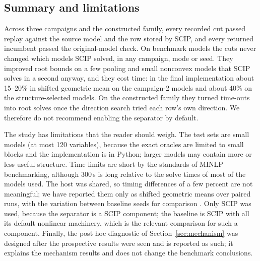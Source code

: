 \subsection{Summary and limitations}\label{sec:comp-summary}

Across three campaigns and the constructed family, every recorded cut
passed replay against the source model and the row stored by SCIP, and
every returned incumbent passed the original-model check. On benchmark
models the cuts never changed which models SCIP solved, in any campaign,
mode or seed. They improved root bounds on a few pooling and small
nonconvex models that SCIP solves in a second anyway, and they cost time:
in the final implementation about 15--20\% in shifted geometric mean on the
campaign-2 models and about 40\% on the structure-selected models. On the
constructed family they turned time-outs into root solves once the
direction search tried each row's own direction. We therefore do not
recommend enabling the separator by default.

The study has limitations that the reader should weigh. The test sets are
small models (at most 120 variables), because the exact oracles are
limited to small blocks and the implementation is in Python; larger models
may contain more or less useful structure. Time limits are short by the
standards of MINLP benchmarking, although 300\,s is long relative to the
solve times of most of the models used. The host was shared, so timing
differences of a few percent are not meaningful; we have reported them
only as shifted geometric means over paired runs, with the variation
between baseline seeds for comparison \citep{LodiTramontani2013}. Only SCIP
was used, because the separator is a SCIP component; the baseline is SCIP
with all its default nonlinear machinery, which is the relevant comparison
for such a component. Finally, the post hoc diagnostic of
Section~\ref{sec:mechanism} was designed after the prospective results were
seen and is reported as such; it explains the mechanism results and does
not change the benchmark conclusions.
